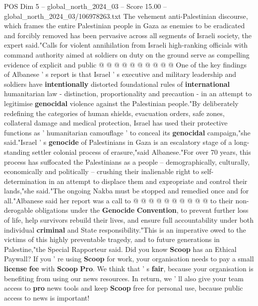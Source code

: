 \begin{textsample}{POS Dim 5 – global\_north\_2024\_03 – Score 15.00 – global\_north\_2024\_03/106978263.txt}
The vehement anti-Palestinian discourse, which frames the entire Palestinian people in Gaza as enemies to be eradicated and forcibly removed has been pervasive across all segments of Israeli society, the expert said."Calls for violent annihilation from Israeli high-ranking officials with command authority aimed at soldiers on duty on the ground serve as compelling evidence of explicit and public @ @ @ @ @ @ @ @ @ @ One of the key findings of Albanese ' s report is that Israel ' s executive and military leadership and soldiers have \textbf{intentionally} distorted foundational rules of \textbf{international} humanitarian law - distinction, proportionality and precaution - in an attempt to legitimise \textbf{genocidal} violence against the Palestinian people."By deliberately redefining the categories of human shields, evacuation orders, safe zones, collateral damage and medical protection, Israel has used their protective functions as ' humanitarian camouflage ' to conceal its \textbf{genocidal} campaign,"she said."Israel ' s \textbf{genocide} of Palestinians in Gaza is an escalatory stage of a long-standing settler colonial process of erasure,"said Albanese."For over 70 years, this process has suffocated the Palestinians as a people -- demographically, culturally, economically and politically -- crushing their inalienable right to self-determination in an attempt to displace them and expropriate and control their lands,"she said."The ongoing Nakba must be stopped and remedied once and for all."Albanese said her report was a call to @ @ @ @ @ @ @ @ @ @ to their non-derogable obligations under the \textbf{Genocide} \textbf{Convention}, to prevent further loss of life, help survivors rebuild their lives, and ensure full accountability under both individual \textbf{criminal} and State responsibility."This is an imperative owed to the victims of this highly preventable tragedy, and to future generations in Palestine,"the Special Rapporteur said.
Did you know \textbf{Scoop} has an Ethical Paywall?
If you ' re using \textbf{Scoop} for work, your organisation needs to pay a small \textbf{license} \textbf{fee} with \textbf{Scoop} \textbf{Pro}.
We think that ' s \textbf{fair}, because your organisation is benefiting from using our news resources.
In return, we ' ll also give your team access to \textbf{pro} news tools and keep \textbf{Scoop} free for personal use, because public access to news is important!

\end{textsample}
